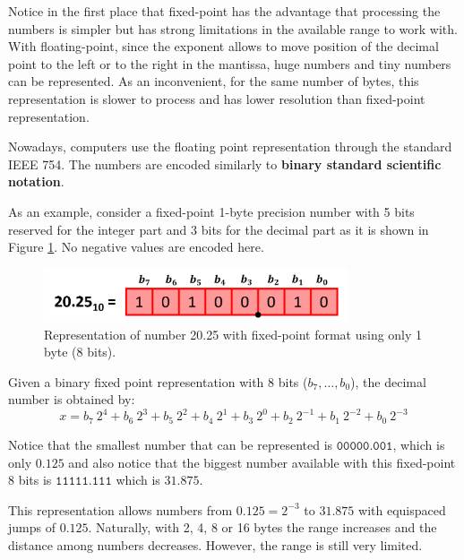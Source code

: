 Notice in the first place that fixed-point has the advantage that processing the numbers is simpler
but has strong limitations in the available range to work with. 
With floating-point, since the exponent allows to move position of the decimal point 
to the left or to the right in the mantissa, huge numbers and tiny numbers can be represented.
As an inconvenient, for the same number of bytes, 
this representation is slower to process and has lower resolution than fixed-point representation.

Nowadays, computers use the floating point representation through the standard IEEE 754.
The numbers are encoded similarly to \textbf{binary standard scientific notation}. 
 
 
 
 
 
As an example, 
consider a fixed-point 1-byte precision number with 5 bits reserved for the integer part and 3 bits
for the decimal part as it is shown in Figure \ref{fig:FixedFloat2}. No negative values are encoded here. 

\begin{figure}[h]
    \centering
    \includegraphics[width= 0.8\textwidth]{./doc/Figures/FixedFloat3.png}
    \caption{Representation of number 20.25 with fixed-point format using only 1 byte (8 bits).}
    \label{fig:FixedFloat2}
\end{figure}

Given a binary fixed point representation with 8 bits ($b_7, \ldots, b_0$), the decimal number is obtained by: 
$$
   x = b_7 \ 2^4 + b_6 \ 2^3 + b_5 \ 2^2  + b_4 \ 2^1 + b_3 \ 2^0 + b_2 \ 2^{-1}  + b_1 \ 2^{-2} + b_0 \ 2^{-3}
$$

Notice that the smallest number that can be represented is
$\texttt{00000.001}$, which is only $0.125$ 
and also notice that the biggest number available with this fixed-point 8 bits is $\texttt{11111.111}$
which is $31.875$.

This representation allows numbers from $0.125 = 2^{-3}$ to $31.875$ with equispaced jumps of $0.125$. 
Naturally, with 2, 4, 8 or 16 bytes the range increases 
and the distance among numbers decreases. However, the range is still very limited. 





